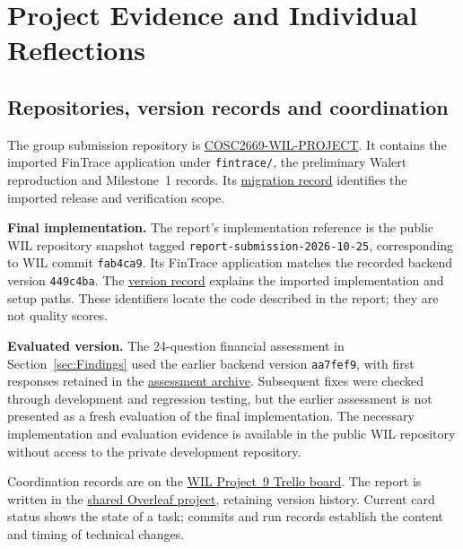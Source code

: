 \section{Project Evidence and Individual Reflections}
\label{app:project_evidence}

\subsection{Repositories, version records and coordination}
\label{app:implementation_versions}
The group submission repository is \href{https://github.com/AyushiNegi20/COSC2669-WIL-PROJECT}{COSC2669-WIL-PROJECT}. It contains the imported FinTrace application under \texttt{fintrace/}, the preliminary Walert reproduction and Milestone~1 records. Its \href{https://github.com/AyushiNegi20/COSC2669-WIL-PROJECT/blob/main/fintrace/docs/WIL_MIGRATION.md}{migration record} identifies the imported release and verification scope.

\textbf{Final implementation.} The report's implementation reference is the public WIL repository snapshot tagged \texttt{report-submission-2026-10-25}, corresponding to WIL commit \texttt{fab4ca9}. Its FinTrace application matches the recorded backend version \texttt{449c4ba}. The \href{https://github.com/AyushiNegi20/COSC2669-WIL-PROJECT/blob/report-submission-2026-10-25/report/IMPLEMENTATION_CHECKPOINT.md}{version record} explains the imported implementation and setup paths. These identifiers locate the code described in the report; they are not quality scores.

\textbf{Evaluated version.} The 24-question financial assessment in Section~\ref{sec:Findings} used the earlier backend version \texttt{aa7fef9}, with first responses retained in the \href{https://github.com/AyushiNegi20/COSC2669-WIL-PROJECT/tree/report-submission-2026-10-25/report/evidence/historical-release-20260926T233529Z}{assessment archive}. Subsequent fixes were checked through development and regression testing, but the earlier assessment is not presented as a fresh evaluation of the final implementation. The necessary implementation and evaluation evidence is available in the public WIL repository without access to the private development repository.

Coordination records are on the \href{https://trello.com/b/TlRdAYBm/cosc2669-wil-project}{WIL Project~9 Trello board}. The report is written in the \href{https://www.overleaf.com/project/6a825099db573616c529838b}{shared Overleaf project}, retaining version history. Current card status shows the state of a task; commits and run records establish the content and timing of technical changes.

